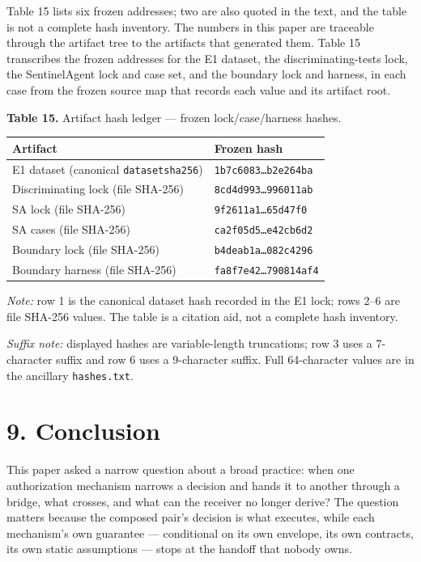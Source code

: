 \documentclass[
  10pt,
]{article}
\newcounter{none} %
\renewcommand{\_}{\origunderscore\allowbreak}
\begin{document}
Table 15 lists six frozen addresses; two are also quoted in the text,
and the table is not a complete hash inventory. The numbers in this
paper are traceable through the artifact tree to the artifacts that
generated them. Table 15 transcribes the frozen addresses for the E1
dataset, the discriminating-tests lock, the SentinelAgent lock and case
set, and the boundary lock and harness, in each case from the frozen
source map that records each value and its artifact root.

\textbf{Table 15.} Artifact hash ledger --- frozen lock/case/harness
hashes.

{\def\LTcaptype{none} %
\begin{longtable}[]{@{}ll@{}}
\toprule\noalign{}
Artifact & Frozen hash \\
\midrule\noalign{}
\endhead
\bottomrule\noalign{}
\endlastfoot
E1 dataset (canonical \texttt{dataset\_sha256}) &
\texttt{1b7c6083…b2e264ba} \\
Discriminating lock (file SHA-256) & \texttt{8cd4d993…996011ab} \\
SA lock (file SHA-256) & \texttt{9f2611a1…65d47f0} \\
SA cases (file SHA-256) & \texttt{ca2f05d5…e42cb6d2} \\
Boundary lock (file SHA-256) & \texttt{b4deab1a…082c4296} \\
Boundary harness (file SHA-256) & \texttt{fa8f7e42…790814af4} \\
\end{longtable}
}

\emph{Note:} row 1 is the canonical dataset hash recorded in the E1
lock; rows 2--6 are file SHA-256 values. The table is a citation aid,
not a complete hash inventory.

\emph{Suffix note:} displayed hashes are variable-length truncations;
row 3 uses a 7-character suffix and row 6 uses a 9-character suffix.
Full 64-character values are in the ancillary \texttt{hashes.txt}.

\section{9. Conclusion}\label{conclusion}

This paper asked a narrow question about a broad practice: when one
authorization mechanism narrows a decision and hands it to another
through a bridge, what crosses, and what can the receiver no longer
derive? The question matters because the composed pair's decision is
what executes, while each mechanism's own guarantee --- conditional on
its own envelope, its own contracts, its own static assumptions ---
stops at the handoff that nobody owns.
\end{document}
